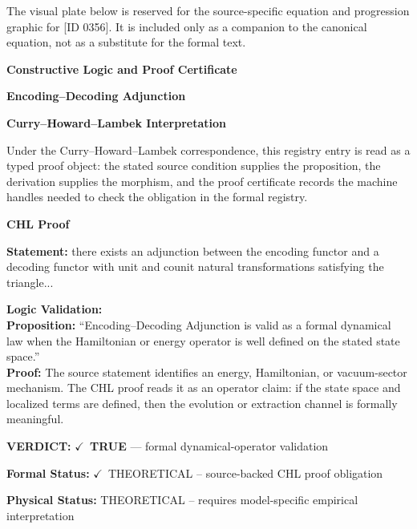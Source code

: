\begingroup\footnotesize\sloppy
The visual plate below is reserved for the source-specific equation and progression graphic for [ID 0356]. It is included only as a companion to the canonical equation, not as a substitute for the formal text.
\par\endgroup
\ifTZPDarkEdition
{}
\fi

\clearpage
\begingroup\tzpsupportsetup
\noindent\textbf{\fontsize{10.8pt}{12.8pt}\selectfont [ID 0356] Constructive Logic and Proof Certificate}\par
\noindent\textbf{\fontsize{10pt}{12pt}\selectfont Encoding--Decoding Adjunction}\par
\vspace{0.45em}
\begingroup
\footnotesize
\setlength{\parskip}{0.22em}
\setlength{\parindent}{0pt}
\noindent\textbf{Curry--Howard--Lambek Interpretation}\par
Under the Curry--Howard--Lambek correspondence, this registry entry is read as a typed proof
object: the stated source condition supplies the proposition, the derivation supplies the
morphism, and the proof certificate records the machine handles needed to check the obligation
in the formal registry.

\vspace{0.45em}
\noindent\textbf{CHL Proof}\par
\textbf{Statement:} there exists an adjunction between the encoding functor and a decoding functor with unit
and counit natural transformations satisfying the triangle...

\textbf{Logic Validation:}\\
\textbf{Proposition:} ``Encoding--Decoding Adjunction is valid as a formal dynamical law when the Hamiltonian or
energy operator is well defined on the stated state space.''\\
\textbf{Proof:} The source statement identifies an energy, Hamiltonian, or vacuum-sector mechanism. The
CHL proof reads it as an operator claim: if the state space and localized terms are
defined, then the evolution or extraction channel is formally meaningful.

\textbf{VERDICT:} \ensuremath{\checkmark}\ \textbf{TRUE} --- formal dynamical-operator validation

\textbf{Formal Status:} \ensuremath{\checkmark}\ THEORETICAL -- source-backed CHL proof obligation

\textbf{Physical Status:} THEORETICAL -- requires model-specific empirical interpretation
\par\vspace{0.45em}
\par
\ifTZPDarkEdition
{}
\fi
\endgroup
\endgroup
